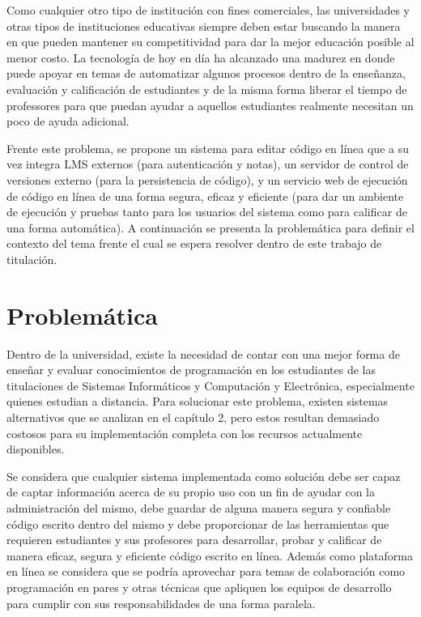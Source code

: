 Como cualquier otro tipo de institución con fines comerciales, las universidades y otras tipos de instituciones educativas siempre deben estar buscando la manera en que pueden mantener su competitividad para dar la mejor educación posible al menor costo. La tecnología de hoy en día ha alcanzado una madurez en donde puede apoyar en temas de automatizar algunos procesos dentro de la enseñanza, evaluación y calificación de estudiantes y de la misma forma liberar el tiempo de professores para que puedan ayudar a aquellos estudiantes realmente necesitan un poco de ayuda adicional.
 
Frente este problema, se propone un sistema para editar código en línea que a su vez integra LMS externos (para autenticación y notas), un servidor de control de versiones externo (para la persistencia de código), y un servicio web de ejecución de código en línea de una forma segura, eficaz y eficiente (para dar un ambiente de ejecución y pruebas tanto para los usuarios del sistema como para calificar de una forma automática). A continuación se presenta la problemática para definir el contexto del tema frente el cual se espera resolver dentro de este trabajo de titulación.

\section{Problemática}
Dentro de la universidad, existe la necesidad de contar con una mejor forma de enseñar y evaluar conocimientos de programación en los estudiantes de las titulaciones de Sistemas Informáticos y Computación y Electrónica, especialmente quienes estudian a distancia. Para solucionar este problema, existen sistemas alternativos que se analizan en el capítulo 2, pero estos resultan demasiado costosos para su implementación completa con los recursos actualmente disponibles.
 
Se considera que cualquier sistema implementada como solución debe ser capaz de captar información acerca de su propio uso con un fin de ayudar con la administración del mismo, debe guardar de alguna manera segura y confiable código escrito dentro del mismo y debe proporcionar de las herramientas que requieren estudiantes y sus profesores para desarrollar, probar y calificar de manera eficaz, segura y eficiente código escrito en línea. Además como plataforma en línea se considera que se podría aprovechar para temas de colaboración como programación en pares y otras técnicas que apliquen los equipos de desarrollo para cumplir con sus responsabilidades de una forma paralela.

